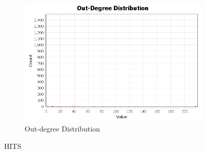 \documentclass[a4paper,12pt]{article}
\begin{document}
\begin{figure}
         \begin{subfigure}[c]{0.675\textwidth}
                \includegraphics[width=\textwidth]{outdegree-distribution.png}
                \caption{Out-degree Distribution}
                
        \end{subfigure}%
        \caption{HITS}
\end{figure}
\end{document}
